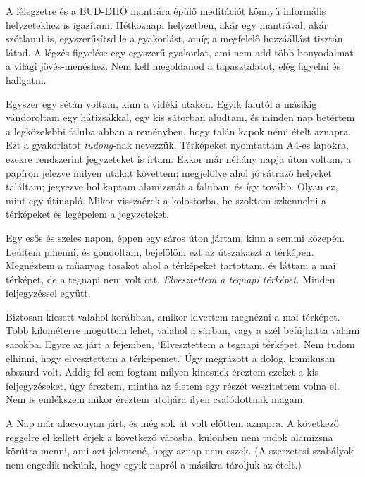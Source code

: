 A lélegzetre és a BUD-DHÓ mantrára épülő meditációt könnyű informális
helyzetekhez is igazítani. Hétköznapi helyzetben, akár egy mantrával,
akár szótlanul is, egyszerűsítsd le a gyakorlást, amíg a megfelelő
hozzáállást tisztán látod. A légzés figyelése egy egyszerű gyakorlat,
ami nem add több bonyodalmat a világi jövés-menéshez. Nem kell
megoldanod a tapasztalatot, elég figyelni és hallgatni.


Egyszer egy sétán voltam, kinn a vidéki utakon. Egyik falutól a másikig
vándoroltam egy hátizsákkal, egy kis sátorban aludtam, és minden nap
betértem a legközelebbi faluba abban a reményben, hogy talán kapok némi
ételt aznapra. Ezt a gyakorlatot \emph{tudong}-nak nevezzük. Térképeket
nyomtattam A4-es lapokra, ezekre rendszerint jegyzeteket is írtam. Ekkor
már néhány napja úton voltam, a papíron jelezve milyen utakat követtem;
megjelölve ahol jó sátrazó helyeket találtam; jegyezve hol kaptam
alamizsnát a faluban; és így tovább. Olyan ez, mint egy útinapló. Mikor
visszaérek a kolostorba, be szoktam szkennelni a térképeket és legépelem
a jegyzeteket.

\enlargethispage*{\baselineskip}

Egy esős és szeles napon, éppen egy sáros úton jártam, kinn a semmi
közepén. Leültem pihenni, és gondoltam, bejelölöm ezt az útszakaszt a
térképen. Megnéztem a műanyag tasakot ahol a térképeket tartottam, és
láttam a mai térképet, de a tegnapi nem volt ott. \emph{Elvesztettem a
tegnapi térképet.} Minden feljegyzéssel együtt.

Biztosan kiesett valahol korábban, amikor kivettem megnézni a mai
térképet. Több kilométerre mögöttem lehet, valahol a sárban, vagy a szél
befújhatta valami sarokba. Egyre az járt a fejemben, `Elvesztettem a
tegnapi térképet. Nem tudom elhinni, hogy elvesztettem a térképemet.'
Úgy megrázott a dolog, komikusan abszurd volt. Addig fel sem fogtam
milyen kincsnek éreztem ezeket a kis feljegyzéseket, úgy éreztem, mintha
az életem egy részét veszítettem volna el. Nem is emlékszem mikor
éreztem utoljára ilyen csalódottnak magam.

A Nap már alacsonyan járt, és még sok út volt előttem aznapra. A
következő reggelre el kellett érjek a következő városba, különben nem
tudok alamizsna körútra menni, ami azt jelentené, hogy aznap nem eszek.
(A szerzetesi szabályok nem engedik nekünk, hogy egyik napról a másikra
tároljuk az ételt.)

